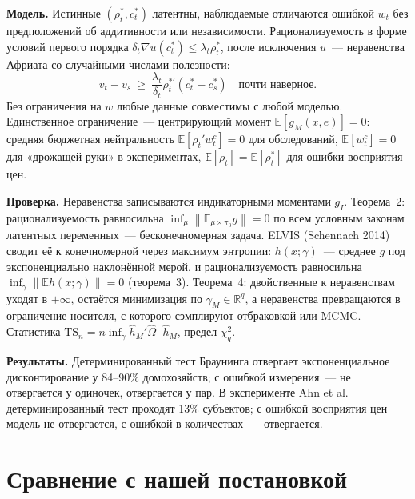 \documentclass[a4paper,11pt]{article}
\theoremstyle{plain}
\theoremstyle{definition}
\theoremstyle{remark}
\newcommand{\R}{\mathbb{R}}
\newcommand{\norm}[1]{\left\lVert #1 \right\rVert}
\begin{document}
\textbf{Модель.} Истинные $(\rho_t^*,c_t^*)$ латентны, наблюдаемые отличаются ошибкой $w_t$ без предположений об аддитивности или независимости. Рационализуемость в форме условий первого порядка $\delta_t\nabla u(c_t^*)\le\lambda_t\rho_t^*$, после исключения $u$~--- неравенства Африата со случайными числами полезности:
\[
    v_t-v_s\ \ge\ \frac{\lambda_t}{\delta_t}\rho_t^{*\prime}(c_t^*-c_s^*)\quad\text{почти наверное}.
\]
Без ограничения на $w$ любые данные совместимы с любой моделью. Единственное ограничение~--- центрирующий момент $\mathbb E[g_M(x,e)]=0$: средняя бюджетная нейтральность $\mathbb E[\rho_t'w^c_t]=0$ для обследований, $\mathbb E[w^c_t]=0$ для «дрожащей руки» в экспериментах, $\mathbb E[\rho_t]=\mathbb E[\rho_t^*]$ для ошибки восприятия цен.

\textbf{Проверка.} Неравенства записываются индикаторными моментами $g_I$. Теорема~2: рационализуемость равносильна $\inf_\mu\norm{\mathbb E_{\mu\times\pi_0}g}=0$ по всем условным законам латентных переменных~--- бесконечномерная задача. ELVIS (Schennach 2014) сводит её к конечномерной через максимум энтропии: $h(x;\gamma)$~--- среднее $g$ под экспоненциально наклонённой мерой, и рационализуемость равносильна $\inf_\gamma\norm{\mathbb E h(x;\gamma)}=0$ (теорема~3). Теорема~4: двойственные к неравенствам уходят в $+\infty$, остаётся минимизация по $\gamma_M\in\R^q$, а неравенства превращаются в ограничение носителя, с которого сэмплируют отбраковкой или MCMC. Статистика $\mathrm{TS}_n=n\inf_\gamma\hat h_M'\hat\Omega^-\hat h_M$, предел $\chi^2_q$.

\textbf{Результаты.} Детерминированный тест Браунинга отвергает экспоненциальное дисконтирование у 84--90\% домохозяйств; с ошибкой измерения~--- не отвергается у одиночек, отвергается у пар. В эксперименте Ahn et al. детерминированный тест проходят 13\% субъектов; с ошибкой восприятия цен модель не отвергается, с ошибкой в количествах~--- отвергается.

\section{Сравнение с нашей постановкой}
\end{document}
